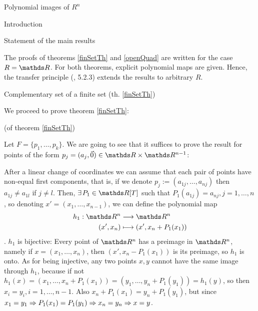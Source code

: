\documentclass[11pt, a4paper, english, twoside, notitlepage]{report}
\begin{document}
\begin{chapter}{Polynomial images of $R^n$}
\begin{section}{Introduction}
\begin{subsection}{Statement of the main results}
\begin{Proof}
		\end{Proof}
	
		The proofs of theorems \ref{finSetTh} and \ref{openQuad} are written for the case $R = \R$. For both theorems, explicit polynomial maps are given. Hence, the transfer principle (\cite{bcr}, 5.2.3) extends the results to arbitrary $R$.
	
	\end{subsection}
	
\end{section}

\begin{section}{Complementary set of a finite set (th. \ref{finSetTh})}
	
	We proceed to prove theorem \ref{finSetTh}:
	
	\begin{Proof}(of theorem \ref{finSetTh})
		
		Let $F=\{p_1,\dots,p_k\}$. We are going to see that it suffices to prove the result for points of the form $p_j=(a_j,\vec{0})\in\R\times\R^{n-1}$:

		After a linear change of coordinates we can assume that each pair of points have non-equal first components, that is, if we denote $p_j:=(a_{1j},\dots,a_{nj})$ then $a_{1j}\neq a_{1l}$ if $j\neq l$. Then, $\exists P_1\in\R[T]$ such that $P_1(a_{1j})=a_{nj}, j = 1,\dots, n$, so denoting $x'=(x_1,\dots,x_{n-1})$, we can define the polynomial map 
		\begin{align*}
			h_1: \R^n & \longrightarrow \R^n \\
			(x',x_n) & \longmapsto (x',x_n+P_1(x_1))
		\end{align*}
		. $h_1$ is bijective: Every point of $\R^n$ has a preimage in $\R^n$, namely if $x = (x_1, \dots, x_n)$, then $(x', x_n - P_1(x_1))$ is its preimage, so $h_1$ is onto. As for being injective, any two points $x, y$ cannot have the same image through $h_1$, because if not $h_1(x) = (x_1, \dots, x_n+ P_1(x_1)) = (y_1, \dots, y_n+ P_1(y_1)) = h_1(y)$, so then $x_i = y_i, i = 1, \dots, n-1$.  Also $x_n + P_1(x_1) = y_n + P_1(y_1)$, but since $x_1 = y_1 \Rightarrow P_1(x_1) = P_1(y_1) \Rightarrow x_n = y_n \Rightarrow x = y$.
		

\end{Proof}
\end{section}
\end{chapter}
\end{document}
